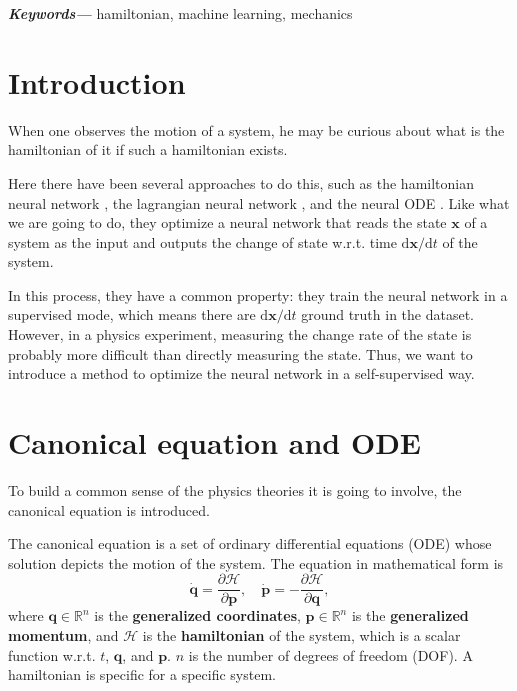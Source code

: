 \documentclass{article}
\providecommand{\keywords}[1]
{
  \small	
  \textbf{\textit{Keywords---}} #1
}
\begin{document}
\keywords{hamiltonian, machine learning, mechanics}

\tableofcontents

\section{Introduction}

When one observes the motion of a system,
he may be curious about what is the hamiltonian of it
if such a hamiltonian exists.

Here there have been several approaches to do this,
such as the hamiltonian neural network \cite{greydanus2019hamiltonian},
the lagrangian neural network \cite{cranmer2020lagrangian},
and the neural ODE \cite{chen2018ode}.
Like what we are going to do,
they optimize a neural network that reads the state $\mathbf x$ of a system as the input
and outputs the change of state w.r.t. time $\mathrm d\mathbf x/\mathrm dt$ of the system.

In this process, they have a common property:
they train the neural network in a supervised mode,
which means there are $\mathrm d\mathbf x/\mathrm dt$ ground truth in the dataset.
However, in a physics experiment, measuring the change rate of the state is probably more difficult than directly measuring the state.
Thus, we want to introduce a method to optimize the neural network in a self-supervised way.

\section{Canonical equation and ODE}

To build a common sense of the physics theories it is going to involve,
the canonical equation is introduced.

The canonical equation is a set of ordinary differential equations (ODE)
whose solution depicts the motion of the system.
The equation in mathematical form is \cite{hand2008mechanics}\cite[p. 65]{arnold1989mathmech}\cite[p. 132]{landau1976mechanics}
\begin{equation}
	\dot{\mathbf q}=\frac{\partial\mathcal H}{\partial\mathbf p},
	\quad
	\dot{\mathbf p}=-\frac{\partial\mathcal H}{\partial\mathbf q},
	\label{eq:canonical}
\end{equation}
where $\mathbf q\in\mathbb R^n$ is the \textbf{generalized coordinates},
$\mathbf p\in\mathbb R^n$ is the \textbf{generalized momentum},
and $\mathcal H$ is the \textbf{hamiltonian} of the system,
which is a scalar function w.r.t. $t$, $\mathbf q$, and $\mathbf p$.
$n$ is the number of degrees of freedom (DOF).
A hamiltonian is specific for a specific system.
\end{document}
